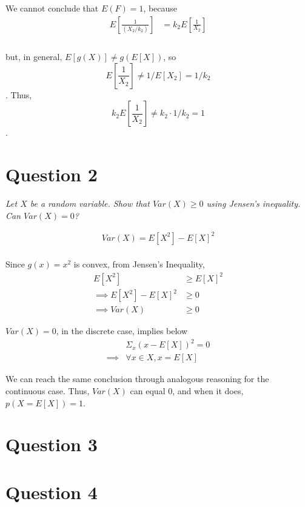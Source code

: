 \documentclass[
]{article}
\begin{document}
We cannot conclude that \(E(F) = 1\), because \[\begin{aligned} 
E[\frac{1}{(X_2/k_2)}] &= k_2 E[\frac{1}{X_2}] \\
\end{aligned}\]\\
but, in general, \(E[g(X)] \neq g(E[X])\), so
\[E[\frac{1}{X_2}] \neq 1/E[X_2] = 1/k_2\]. Thus,
\[k_2 E[\frac{1}{X_2}] \neq k_2 \cdot 1/k_2 = 1\].

\hypertarget{question-2}{%
\section{Question 2}\label{question-2}}

\textit{Let $X$ be a random variable. Show that $Var (X) \geq 0$ using Jensen’s inequality. Can $Var (X) = 0$?}

\[\begin{aligned} 
Var(X) = E[X^2] - E[X]^2 
\end{aligned}\]\\
Since \(g(x) = x^2\) is convex, from Jensen's Inequality,
\[\begin{aligned} 
E[X^2] &\geq E[X]^2 \\
\implies E[X^2] - E[X]^2 &\geq 0 \\
\implies Var(X) &\geq 0
\end{aligned}\]

\(Var(X) = 0\), in the discrete case, implies below \[\begin{aligned}
&\Sigma_x (x -E[X])^2 = 0 \\
\implies &\forall x \in X, x = E[X] 
\end{aligned}\]

We can reach the same conclusion through analogous reasoning for the
continuous case. Thus, \(Var(X)\) can equal \(0\), and when it does,
\(p(X = E[X]) = 1\).

\hypertarget{question-3}{%
\section{Question 3}\label{question-3}}

\break

\hypertarget{question-4}{%
\section{Question 4}\label{question-4}}
\end{document}
